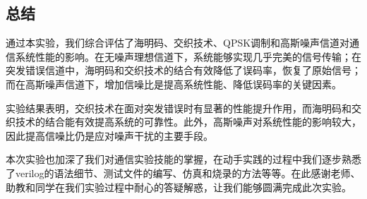 \subsection{总结}

通过本实验，我们综合评估了海明码、交织技术、QPSK调制和高斯噪声信道对通信系统性能的影响。在无噪声理想信道下，系统能够实现几乎完美的信号传输；在突发错误信道中，海明码和交织技术的结合有效降低了误码率，恢复了原始信号；而在高斯噪声信道下，增加信噪比是提高系统性能、降低误码率的关键因素。

实验结果表明，交织技术在面对突发错误时有显著的性能提升作用，而海明码和交织技术的结合能有效提高系统的可靠性。此外，高斯噪声对系统性能的影响较大，因此提高信噪比仍是应对噪声干扰的主要手段。

本次实验也加深了我们对通信实验技能的掌握，在动手实践的过程中我们逐步熟悉了verilog的语法细节、测试文件的编写、仿真和烧录的方法等等。在此感谢老师、助教和同学在我们实验过程中耐心的答疑解惑，让我们能够圆满完成此次实验。